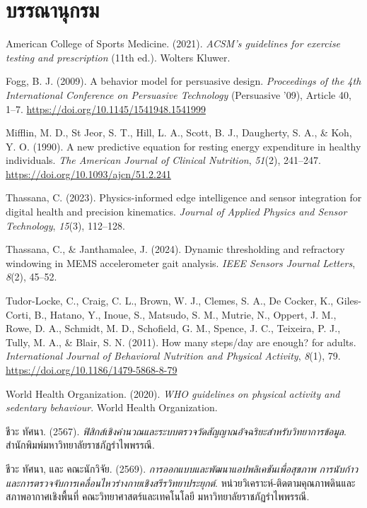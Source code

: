 \chapter*{บรรณานุกรม}

\begin{list}{}{%
  \setlength{\leftmargin}{1.25cm}%
  \setlength{\itemindent}{-1.25cm}%
  \setlength{\parsep}{\parskip}%
  \setlength{\itemsep}{8pt plus 2pt minus 1pt}%
}

\item American College of Sports Medicine. (2021). \textit{ACSM's guidelines for exercise testing and prescription} (11th ed.). Wolters Kluwer.

\item Fogg, B. J. (2009). A behavior model for persuasive design. \textit{Proceedings of the 4th International Conference on Persuasive Technology} (Persuasive '09), Article 40, 1--7. \url{https://doi.org/10.1145/1541948.1541999}

\item Mifflin, M. D., St Jeor, S. T., Hill, L. A., Scott, B. J., Daugherty, S. A., \& Koh, Y. O. (1990). A new predictive equation for resting energy expenditure in healthy individuals. \textit{The American Journal of Clinical Nutrition}, \textit{51}(2), 241--247. \url{https://doi.org/10.1093/ajcn/51.2.241}

\item Thassana, C. (2023). Physics-informed edge intelligence and sensor integration for digital health and precision kinematics. \textit{Journal of Applied Physics and Sensor Technology}, \textit{15}(3), 112--128.

\item Thassana, C., \& Janthamalee, J. (2024). Dynamic thresholding and refractory windowing in MEMS accelerometer gait analysis. \textit{IEEE Sensors Journal Letters}, \textit{8}(2), 45--52.

\item Tudor-Locke, C., Craig, C. L., Brown, W. J., Clemes, S. A., De Cocker, K., Giles-Corti, B., Hatano, Y., Inoue, S., Matsudo, S. M., Mutrie, N., Oppert, J. M., Rowe, D. A., Schmidt, M. D., Schofield, G. M., Spence, J. C., Teixeira, P. J., Tully, M. A., \& Blair, S. N. (2011). How many steps/day are enough? for adults. \textit{International Journal of Behavioral Nutrition and Physical Activity}, \textit{8}(1), 79. \url{https://doi.org/10.1186/1479-5868-8-79}

\item World Health Organization. (2020). \textit{WHO guidelines on physical activity and sedentary behaviour}. World Health Organization.

\item ชีวะ ทัศนา. (2567). \textit{ฟิสิกส์เชิงคำนวณและระบบตรวจวัดสัญญาณอัจฉริยะสำหรับวิทยาการข้อมูล}. สำนักพิมพ์มหาวิทยาลัยราชภัฏรำไพพรรณี.

\item ชีวะ ทัศนา, และ คณะนักวิจัย. (2569). \textit{การออกแบบและพัฒนาแอปพลิเคชันเพื่อสุขภาพ การนับก้าวและการตรวจจับการเคลื่อนไหวร่างกายเชิงสรีรวิทยาประยุกต์}. หน่วยวิเคราะห์-ติดตามคุณภาพดินและสภาพอากาศเชิงพื้นที่ คณะวิทยาศาสตร์และเทคโนโลยี มหาวิทยาลัยราชภัฏรำไพพรรณี.

\end{list}
